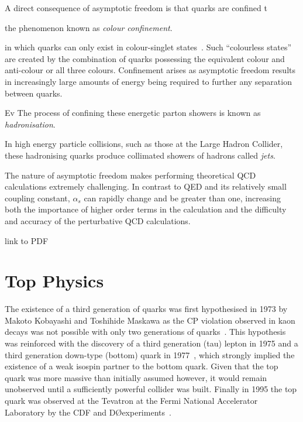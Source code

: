 A direct consequence of asymptotic freedom is that quarks are confined t

the phenomenon  known as \emph{colour confinement}.


in which quarks can only exist in colour-singlet states~\cite{ElectroweakStrong,Griffiths,devenish2004deep}.
Such ``colourless states'' are created by the combination of quarks possessing the equivalent colour and anti-colour or all three colours.
Confinement arises as asymptotic freedom results in increasingly large amounts of energy being required to further any separation between quarks.


Ev
The process of confining these energetic parton showers is known as \emph{hadronisation}.

In high energy particle collisions, such as those at the Large Hadron Collider, these hadronising quarks produce collimated showers of hadrons called \emph{jets}.

The nature of asymptotic freedom makes performing theoretical QCD calculations extremely challenging.
In contrast to QED and its relatively small coupling constant, $\alpha_{s}$ can rapidly change and be greater than one, increasing both the importance of higher order terms in the calculation and the difficulty and accuracy of the perturbative QCD calculations.

link to PDF

\section{Top Physics}\label{sec:top-physics}
The existence of a third generation of quarks was first hypothesised in 1973 by Makoto Kobayashi and Toshihide Maskawa as the CP violation observed in kaon decays was not possible with only two generations of quarks~\cite{Kobayashi:1973fv}.
This hypothesis was reinforced with the discovery of a third generation (tau) lepton in 1975 and a third generation down-type (bottom) quark in 1977~\cite{Herb:1977ek}, which strongly implied the existence of a weak isospin partner to the bottom quark.
Given that the top quark was more massive than initially assumed however, it would remain unobserved until a sufficiently powerful collider was built.
Finally in 1995 the top quark was observed at the Tevatron at the Fermi National Accelerator Laboratory by the CDF and D\O  experiments~\cite{Abe:1995hr,D0:1995jca}.

